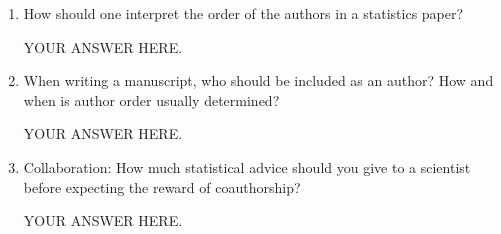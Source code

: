 \documentclass[12pt]{article}
\begin{document}
\begin{enumerate}
\item How should one interpret the order of the authors in a statistics paper? 

YOUR ANSWER HERE.

\item When writing a manuscript, who should be included as an author? How and when is author order usually determined? 

YOUR ANSWER HERE.

\item Collaboration: How much statistical advice should you give to a scientist before expecting the reward of coauthorship?

YOUR ANSWER HERE.

\end{enumerate}
\end{document}
